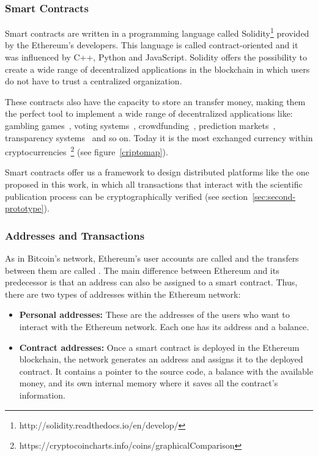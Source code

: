 \subsubsection*{Smart Contracts}
\label{tb:cryptos:sm}

Smart contracts are written in a programming language called
Solidity\footnote{http://solidity.readthedocs.io/en/develop/} provided by the
Ethereum's developers. This language is called contract-oriented and it was
influenced by C++, Python and JavaScript. Solidity offers the possibility to
create a wide range of decentralized applications in the blockchain in which
users do not have to trust a centralized organization.

These contracts also have the capacity to store an transfer money, making them
the perfect tool to implement a wide range of decentralized applications like:
gambling games~\cite{piasecki2016gaming}, voting
systems~\cite{mccorry2017smart}, crowdfunding~\cite{jacynycz2016betfunding},
prediction markets~\cite{peterson2015augur}, transparency
systems~\cite{bonneau2016ethiks} and so on. Today it is the most exchanged
currency within
cryptocurrencies~\footnote{https://cryptocoincharts.info/coins/graphicalComparison}
(see figure~\ref{criptomap}).

Smart contracts offer us a framework to design distributed platforms like the
one proposed in this work, in which all transactions that interact with the
scientific publication process can be cryptographically verified (see
section~\ref{sec:second-prototype}).

\subsubsection*{Addresses and Transactions}
\label{ts:at}

As in Bitcoin's network, Ethereum's user accounts are called  and
the transfers between them are called . The main difference
between Ethereum and its predecessor is that an address can also be assigned to
a smart contract. Thus, there are two types of addresses within the Ethereum
network:

\begin{itemize}

\item \textbf{Personal addresses:} These are the addresses of the users who want
  to interact with the Ethereum network. Each one has its address and a balance.
  
\item \textbf{Contract addresses:} Once a smart contract is deployed in the
  Ethereum blockchain, the network generates an address and assigns it to the
  deployed contract. It contains a pointer to the source code, a balance with
  the available money, and its own internal memory where it saves all the
  contract's information.

\end{itemize}

